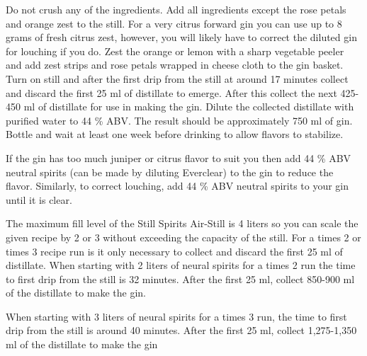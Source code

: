 \documentclass[letterpaper]{recipePMG}
\begin{document}
Do not crush any of the ingredients. Add all ingredients except the rose petals and orange zest to the still. For a very citrus forward gin you can use up to 8 grams of fresh citrus zest, however, you will likely have to correct the diluted gin for louching if you do.  Zest the orange or lemon with a sharp vegetable peeler and add zest strips and rose petals wrapped in cheese cloth to the gin basket.  Turn on still and after the first drip from the still at around 17 minutes collect and discard the first 25 ml of distillate to emerge. After this collect the next 425-450 ml of distillate for use in making the gin. Dilute the collected distillate with purified water to 44 \% ABV. The result should be approximately 750 ml of gin. Bottle and wait at least one week before drinking to allow flavors to stabilize.

If the gin has too much juniper or citrus flavor to suit you then 
add 44 \% ABV neutral spirits (can be made by diluting Everclear) to the gin to reduce the flavor. Similarly, to correct louching, add 44 \% ABV neutral spirits to your gin until it is clear.

The maximum fill level of the Still Spirits Air-Still is 4 liters so you can scale the given recipe by 2 or 3 without exceeding the capacity of the still. For a times 2 or times 3 recipe run is it only necessary to collect and discard the first 25 ml of distillate.  When starting with 2 liters of neural spirits for a times 2 run the time to first drip from the still is 32 minutes. After the first 25 ml, collect 850-900 ml of the distillate to make the gin.

When starting with 3 liters of neural spirits for a times 3 run, the time to first drip from the still is around 40 minutes. After the first 25 ml, collect 1,275-1,350 ml of the distillate to make the gin 




\newpage
{}


\end{document}
